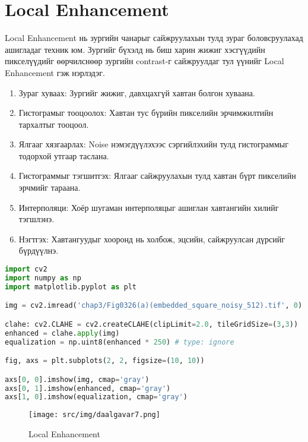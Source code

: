 \newpage
\section{Local Enhancement}
Local Enhancement нь зургийн чанарыг сайжруулахын тулд зураг боловсруулахад
ашигладаг техник юм. Зургийг бүхэлд нь биш харин жижиг хэсгүүдийн
пикселүүдийг өөрчилснөөр зургийн contrast-г сайжруулдаг тул үүнийг Local Enhancement гэж нэрлэдэг.

\begin{enumerate}
    \item Зураг хуваах: Зургийг жижиг, давхцахгүй хавтан болгон хуваана.
    \item Гистограмыг тооцоолох: Хавтан тус бүрийн пикселийн эрчимжилтийн тархалтыг тооцоол.
    \item Ялгааг хязгаарлах: Noise нэмэгдүүлэхээс сэргийлэхийн тулд гистограммыг тодорхой утгаар таслана.
    \item Гистограммыг тэгшитгэх: Ялгааг сайжруулахын тулд хавтан бүрт пикселийн эрчмийг тараана.
    \item Интерполяци: Хоёр шугаман интерполяцыг ашиглан хавтангийн хилийг тэгшлэнэ.
    \item Нэгтгэх: Хавтангуудыг хооронд нь холбож, эцсийн, сайжруулсан дүрсийг бүрдүүлнэ.
\end{enumerate}


\begin{lstlisting}[language=Python, caption=Local Enhancement, frame=single]
import cv2
import numpy as np
import matplotlib.pyplot as plt

img = cv2.imread('chap3/Fig0326(a)(embedded_square_noisy_512).tif', 0)

clahe: cv2.CLAHE = cv2.createCLAHE(clipLimit=2.0, tileGridSize=(3,3))
enhanced = clahe.apply(img)
equalization = np.uint8(enhanced * 250) # type: ignore

fig, axs = plt.subplots(2, 2, figsize=(10, 10))

axs[0, 0].imshow(img, cmap='gray')
axs[0, 1].imshow(enhanced, cmap='gray')
axs[1, 0].imshow(equalization, cmap='gray')
\end{lstlisting}


\begin{figure}[h!]
    \centering
    \texttt{[image: src/img/daalgavar7.png]}
    \caption{Local Enhancement}
\end{figure}


